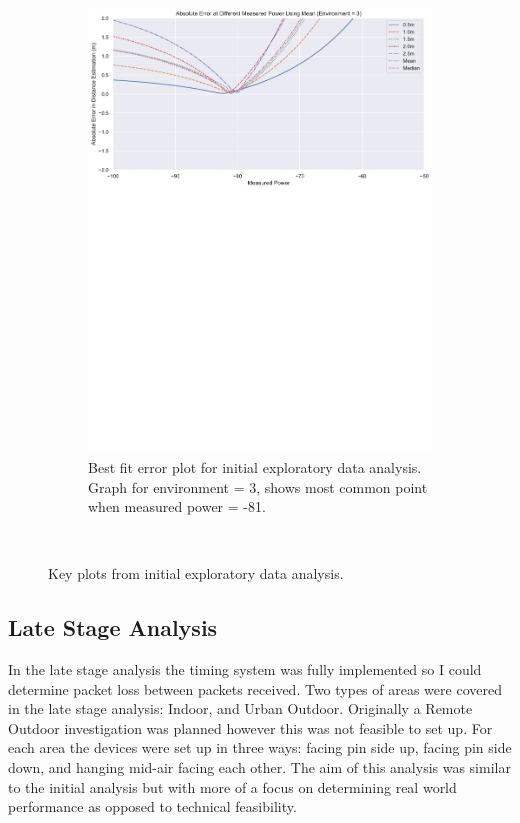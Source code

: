 \documentclass{l4proj}
\begin{document}
\begin{figure}[!htb]
\begin{subfigure}[b]{0.45\textwidth}
        \includegraphics[width=\textwidth]{images/initial_mp_bestfit.pdf}
        \caption{Best fit error plot for initial exploratory data analysis. Graph for environment = 3, shows most common point when measured power = -81.}
        \label{fig:initial_best_fit}
    \end{subfigure}
    ~ %
    \caption{ Key plots from initial exploratory data analysis. }
    \label{fig:density_plots}
\end{figure}

\subsection{Late Stage Analysis}

In the late stage analysis the timing system was fully implemented so I could determine packet loss between packets received. Two types of areas were covered in the late stage analysis: Indoor, and Urban Outdoor. Originally a Remote Outdoor investigation was planned however this was not feasible to set up. For each area the devices were set up in three ways: facing pin side up, facing pin side down, and hanging mid-air facing each other. The aim of this analysis was similar to the initial analysis but with more of a focus on determining real world performance as opposed to technical feasibility.
\end{document}

